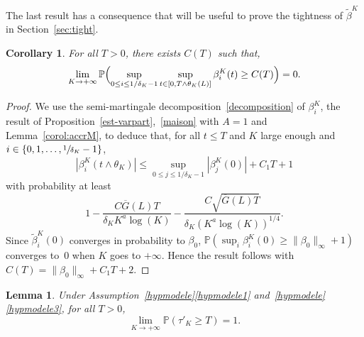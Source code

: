 \documentclass[10pt]{amsart}
\theoremstyle{plain}
\newtheorem{lemma}[theorem]{Lemma}
\newtheorem{corollary}[theorem]{Corollary}
\theoremstyle{remark}
\begin{document}
The last result has a consequence that will be useful to prove the tightness of $\widetilde{\beta}^K$ in Section~\ref{sec:tight}.

\begin{corollary}
\label{lem:upper-bound}
For all $T>0$, there exists $C(T)$ such that,
\[
\lim_{K\to+\infty}\mathbb{P}\Bigl(\sup_{0\leq i\leq 1/
\delta_K-1}\sup_{t\in[0,T\wedge\theta_K(L)]}\beta^K_i(t)\geq C(T)\Bigr)=0.
\]
\end{corollary}

\begin{proof}
We use the semi-martingale decomposition~\eqref{decomposition} of $\beta^K_i$, the result of Proposition~\ref{est-varpart},~\eqref{maison} with $A=1$ and Lemma~\ref{corol:accrM}, to deduce that, for all $t\leq T$ {and $K$ large enough} and $i \in \{0, 1,\dots, \sfrac{1}{\delta_K}-1\}$,
\[
|\beta^K_i(t\wedge\theta_K)|\leq \sup_{0\leq j\leq 1/\delta_K-1}|\beta^K_j(0)|+C_1T+1
\]
with probability at least
\[
1-\frac{C\overline{G}(L)T}{\delta_K K^a\log(K)} -\frac{C\sqrt{\overline{G}(L)T}}{\delta_K(K^a \log(K))^{1/4}}.
\]
Since $\widetilde{\beta}^K_i(0)$ converges in probability to $\beta_0$, $\mathbb{P}(\sup_i \beta^K_i(0)\geq \|\beta_0\|_\infty+1)$ converges to~$0$ when $K$ goes to $+\infty$. Hence the result follows with $C(T)=\|\beta_0\|_\infty+C_1T+2$.
\end{proof}

\label{sec:control-incr}

\begin{lemma}\label{lem:lower-bound} Under Assumption~\ref{hypmodele}\eqref{hypmodele1} and~\ref{hypmodele}\eqref{hypmodele3}, for all $T>0$,
\[
\lim_{K\to+\infty}\mathbb{P}(\tau'_K\geq T) =1.
\]
\end{lemma}
\end{document}
